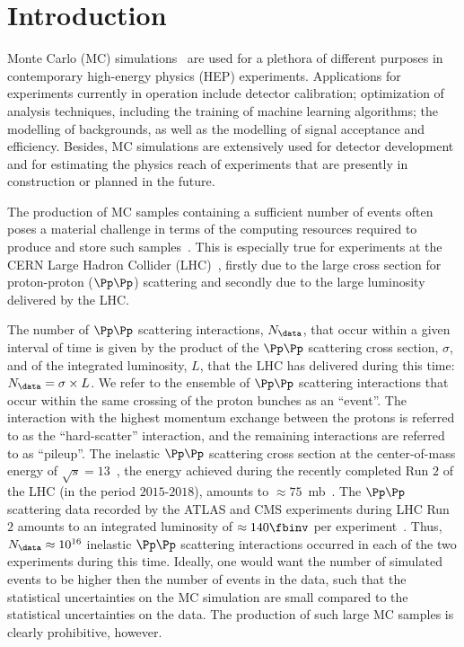 \section{Introduction}
\label{sec:introduction}

Monte Carlo (MC) simulations~\cite{Kroese2014WhyTM,dunn2011exploring} are used for a plethora of different purposes in contemporary high-energy physics (HEP) experiments.
Applications for experiments currently in operation include detector calibration; optimization of analysis techniques, including the training of machine learning algorithms;
the modelling of backgrounds, as well as the modelling of signal acceptance and efficiency.
Besides, MC simulations are extensively used for detector development and for estimating the physics reach of experiments that are presently in construction or planned in the future.

The production of MC samples containing a sufficient number of events often poses a material challenge 
in terms of the computing resources required to produce and store such samples~\cite{HSFPhysicsEventGeneratorWG:2020gxw}.
This is especially true for experiments at the CERN Large Hadron Collider (LHC)~\cite{Bruning:2004ej,Buning:2004wk,Benedikt:2004wm},
firstly due to the large cross section for proton-proton ($\Pp\Pp$) scattering and secondly due to the large luminosity delivered by the LHC.

The number of $\Pp\Pp$ scattering interactions, $N_{\data}$, that occur within a given interval of time 
is given by the product of the $\Pp\Pp$ scattering cross section, $\sigma$, and of the integrated luminosity, $L$, that the LHC has delivered during this time:
$N_{\data} = \sigma \times L$.
We refer to the ensemble of $\Pp\Pp$ scattering interactions that occur within the same crossing of the proton bunches as an ``event''.
The interaction with the highest momentum exchange between the protons is referred to as the ``hard-scatter'' interaction,
and the remaining interactions are referred to as ``pileup''.
The inelastic $\Pp\Pp$ scattering cross section at the center-of-mass energy of $\sqrt{s}=13$~\TeV, the energy achieved during the recently completed Run $2$ of the LHC (in the period $2015$-$2018$),
amounts to $\approx 75$~mb~\cite{Aaboud:2016mmw,Sirunyan:2018nqx}.
The $\Pp\Pp$ scattering data recorded by the ATLAS and CMS experiments during LHC Run $2$ 
amounts to an integrated luminosity of $\approx 140\fbinv$ per experiment~\cite{ATLAS-CONF-2019-021,LUM-17-001,LUM-17-004,LUM-18-002}.
Thus, $N_{\data} \approx 10^{16}$ inelastic $\Pp\Pp$ scattering interactions occurred in each of the two experiments during this time.
Ideally, one would want the number of simulated events to be higher then the number of events in the data,
such that the statistical uncertainties on the MC simulation are small compared to the statistical uncertainties on the data.
The production of such large MC samples is clearly prohibitive, however.

